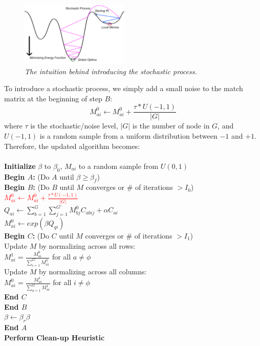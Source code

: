 \begin{figure}[h]
	\centering
	\captionsetup{justification=centering}
	\includegraphics[width=0.46\textwidth]{figs/stochastic.png}
	\caption[Caption for LOF]{\emph{The intuition behind introducing the stochastic process.}}
	\label{fig:stochastic}
\end{figure}

To introduce a stochastic process, we simply add a small noise to the match matrix at the beginning of step \textbf{$B$}:
\begin{equation} 
M_{ai}^{0} \leftarrow M_{ai}^{0} + \frac{\tau * U(-1,1)}{|G|}
\end{equation}
where $\tau$ is the stochastic/noise level, $|G|$ is the number of node in $G$, and $U(-1,1)$ is a random sample from a uniform distribution between $-1$ and $+1$.\\

Therefore, the updated algorithm becomes:\\
\\
\textbf{Initialize} $\beta$ to $\beta_{0}$, $M_{ai}$ to a random sample from $U(0,1)$\\
\textbf{Begin $A$:} (Do $A$ until $\beta \geq \beta_{f}$)\\
\indent \textbf{Begin $B$:} (Do $B$ until $M$ converges or \# of iterations $>I_0$)\\
\indent \textcolor{red}{$M_{ai}^{0} \leftarrow M_{ai}^{0} + \frac{\tau * U(-1,1)}{|G|}$}\\
\indent $Q_{ai} \leftarrow \sum_{b=1}^{G}\sum_{j=1}^{G'}M_{bj}^{0}C_{abij}+\alpha C_{ai}$\\
\indent $M_{ai}^{0} \leftarrow exp(\beta Q_{qi})$\\
\indent \indent \textbf{Begin $C$:} (Do $C$ until $M$ converges or \# of iterations $>I_1$)\\
\indent \indent  Update $M$ by normalizing across all rows:\\
\indent \indent  $M_{ai}^{1}=\frac{M_{ai}^{0}}{\sum_{i=1}^{G'}M_{ai}^{0}}$ for all $a\neq\phi$\\
\indent \indent  Update $M$ by normalizing across all columns:\\
\indent \indent  $M_{ai}^{0}=\frac{M_{ai}^{1}}{\sum_{a=1}^{G}M_{ai}^{1}}$ for all $i\neq\phi$\\
\indent \indent \textbf{End $C$}\\
\indent \textbf{End $B$}\\
$\beta\leftarrow\beta_{r}\beta$\\
\textbf{End $A$}\\
\textbf{Perform Clean-up Heuristic}\\

